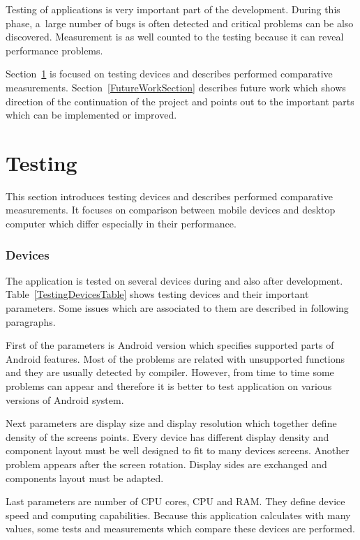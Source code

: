 Testing of applications is very important part of the development. During this phase, a~large number of bugs is often
detected and critical problems can be also discovered. Measurement is as well counted to the testing because it can
reveal performance problems.

Section~\ref{TestingSection} is focused on testing devices and describes performed comparative measurements.
Section~\ref{FutureWorkSection} describes future work which shows direction of the continuation of the project and
points out to the important parts which can be implemented or improved.

\section{Testing}\label{TestingSection}
This section introduces testing devices and describes performed comparative measurements. It focuses on comparison
between mobile devices and desktop computer which differ especially in their performance.

\subsubsection{Devices}
The application is tested on several devices during and also after development. Table~\ref{TestingDevicesTable} shows
testing devices and their important parameters. Some issues which are associated to them are described in following
paragraphs.

First of the parameters is Android version which specifies supported parts of Android features. Most of the problems are
related with unsupported functions and they are usually detected by compiler. However, from time to time some problems
can appear and therefore it is better to test application on various versions of Android system.

Next parameters are display size and display resolution which together define density of the screens points. Every
device has different display density and component layout must be well designed to fit to many devices screens. Another
problem appears after the screen rotation. Display sides are exchanged and components layout must be adapted.

Last parameters are number of CPU cores, CPU and RAM. They define device speed and computing capabilities. Because this
application calculates with many values, some tests and measurements which compare these devices are performed.

